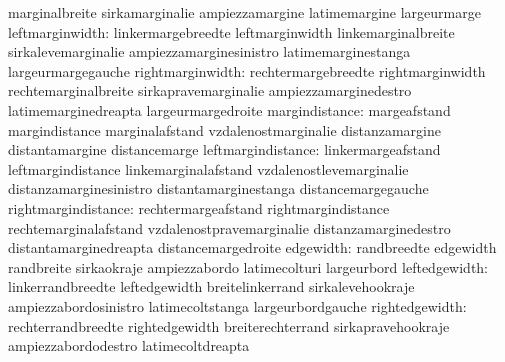                                   marginalbreite                   sirkamarginalie
                                  ampiezzamargine                  latimemargine
                                  largeurmarge
                 leftmarginwidth: linkermargebreedte               leftmarginwidth
                                  linkemarginalbreite              sirkalevemarginalie
                                  ampiezzamarginesinistro          latimemarginestanga
                                  largeurmargegauche
                rightmarginwidth: rechtermargebreedte              rightmarginwidth
                                  rechtemarginalbreite             sirkapravemarginalie
                                  ampiezzamarginedestro            latimemarginedreapta
                                  largeurmargedroite
                  margindistance: margeafstand                     margindistance
                                  marginalafstand                  vzdalenostmarginalie
                                  distanzamargine                  distantamargine
                                  distancemarge
              leftmargindistance: linkermargeafstand               leftmargindistance
                                  linkemarginalafstand             vzdalenostlevemarginalie
                                  distanzamarginesinistro          distantamarginestanga
                                  distancemargegauche
             rightmargindistance: rechtermargeafstand              rightmargindistance
                                  rechtemarginalafstand            vzdalenostpravemarginalie
                                  distanzamarginedestro            distantamarginedreapta
                                  distancemargedroite
                       edgewidth: randbreedte                      edgewidth
                                  randbreite                       sirkaokraje
                                  ampiezzabordo                    latimecolturi
                                  largeurbord
                   leftedgewidth: linkerrandbreedte                leftedgewidth
                                  breitelinkerrand                 sirkalevehookraje
                                  ampiezzabordosinistro            latimecoltstanga
                                  largeurbordgauche
                  rightedgewidth: rechterrandbreedte               rightedgewidth
                                  breiterechterrand                sirkapravehookraje
                                  ampiezzabordodestro              latimecoltdreapta
